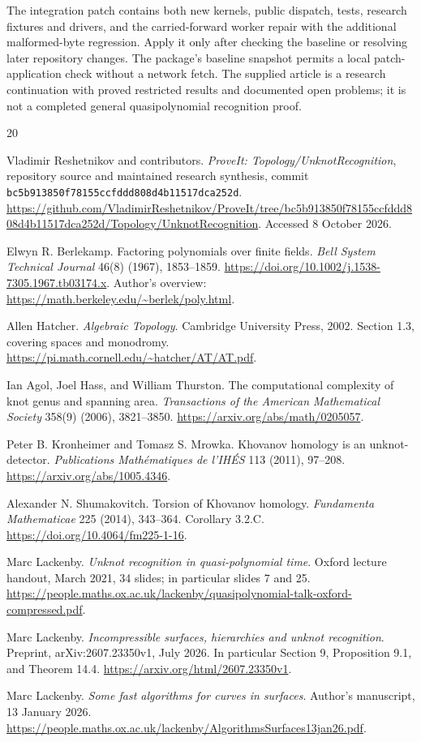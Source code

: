 \documentclass[11pt,a4paper]{article}
\theoremstyle{definition}\newtheorem{definition}[theorem]{Definition}
\theoremstyle{remark}\newtheorem{remark}[theorem]{Remark}
\newcommand{\code}[1]{\nolinkurl{#1}}
\begin{document}
The integration patch contains both new kernels, public dispatch, tests,
research fixtures and drivers, and the carried-forward worker repair with
the additional malformed-byte regression. Apply it only after checking the
baseline or resolving later repository changes. The package's baseline
snapshot permits a local patch-application check without a network fetch.
The supplied article is a research continuation with proved restricted
results and documented open problems; it is not a completed general
quasipolynomial recognition proof.

\begin{thebibliography}{20}

Vladimir Reshetnikov and contributors.
\emph{ProveIt: Topology/UnknotRecognition}, repository source and maintained
research synthesis, commit
\code{bc5b913850f78155ccfddd808d4b11517dca252d}.
\url{https://github.com/VladimirReshetnikov/ProveIt/tree/bc5b913850f78155ccfddd808d4b11517dca252d/Topology/UnknotRecognition}.
Accessed 8 October 2026.

Elwyn R. Berlekamp.
Factoring polynomials over finite fields.
\emph{Bell System Technical Journal} 46(8) (1967), 1853--1859.
\url{https://doi.org/10.1002/j.1538-7305.1967.tb03174.x}.
Author's overview:
\url{https://math.berkeley.edu/~berlek/poly.html}.

Allen Hatcher.
\emph{Algebraic Topology}. Cambridge University Press, 2002.
Section 1.3, covering spaces and monodromy.
\url{https://pi.math.cornell.edu/~hatcher/AT/AT.pdf}.

Ian Agol, Joel Hass, and William Thurston.
The computational complexity of knot genus and spanning area.
\emph{Transactions of the American Mathematical Society} 358(9) (2006),
3821--3850.
\url{https://arxiv.org/abs/math/0205057}.

Peter B. Kronheimer and Tomasz S. Mrowka.
Khovanov homology is an unknot-detector.
\emph{Publications Math\'ematiques de l'IH\'ES} 113 (2011), 97--208.
\url{https://arxiv.org/abs/1005.4346}.

Alexander N. Shumakovitch.
Torsion of Khovanov homology.
\emph{Fundamenta Mathematicae} 225 (2014), 343--364.
Corollary 3.2.C.
\url{https://doi.org/10.4064/fm225-1-16}.

Marc Lackenby.
\emph{Unknot recognition in quasi-polynomial time}.
Oxford lecture handout, March 2021, 34 slides; in particular slides 7 and 25.
\url{https://people.maths.ox.ac.uk/lackenby/quasipolynomial-talk-oxford-compressed.pdf}.

Marc Lackenby.
\emph{Incompressible surfaces, hierarchies and unknot recognition}.
Preprint, arXiv:2607.23350v1, July 2026.
In particular Section 9, Proposition 9.1, and Theorem 14.4.
\url{https://arxiv.org/html/2607.23350v1}.

Marc Lackenby.
\emph{Some fast algorithms for curves in surfaces}.
Author's manuscript, 13 January 2026.
\url{https://people.maths.ox.ac.uk/lackenby/AlgorithmsSurfaces13jan26.pdf}.

\end{thebibliography}
\end{document}
